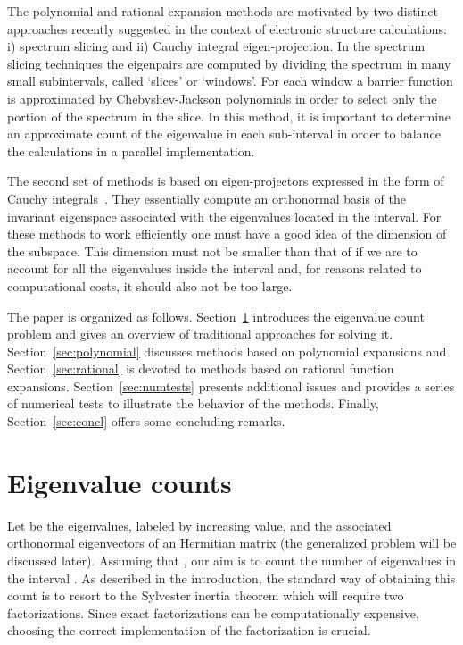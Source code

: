 \documentclass[12pt]{article}		\usepackage{tabls,multirow}
\begin{document}
The polynomial and rational expansion methods are motivated by 
two distinct approaches recently suggested in the context of
electronic structure calculations: i) spectrum slicing and ii) Cauchy
integral eigen-projection. In the spectrum slicing techniques
\cite{Schofield-al-2011} the eigenpairs are computed by dividing the
spectrum in many small subintervals, called `slices' or `windows'.
For each window a barrier function is approximated by
Chebyshev-Jackson polynomials in order to select only the portion of
the spectrum in the slice. In this method, it is important to
determine an approximate count of the eigenvalue in each sub-interval
in order to balance the calculations in a parallel
implementation. 

The second set of methods is based on eigen-projectors
expressed in the form of Cauchy integrals~\cite{FEAST,SakSig03}.
They essentially compute an orthonormal basis of the invariant
eigenspace  associated with the eigenvalues located in the
interval. For these methods to work efficiently one must have a good
idea of the dimension of the subspace. This dimension must not be
smaller than that of  if we are to account for all the
eigenvalues inside the interval  and, for reasons related to
computational costs, it should also not be too large.  


The paper is organized as follows.
Section~\ref{sec:eigcount} introduces the eigenvalue count problem
and gives an overview of traditional approaches for solving it.
Section~\ref{sec:polynomial} discusses methods based on
polynomial expansions and 
Section~\ref{sec:rational} is devoted to methods based on
rational function expansions. Section~\ref{sec:numtests} 
presents additional issues and provides a series of numerical
tests to illustrate the behavior of  the methods.
Finally, Section~\ref{sec:concl} offers some concluding remarks. 


\section{Eigenvalue counts}
\label{sec:eigcount}
Let  be the eigenvalues, labeled by
increasing value, and  the associated
orthonormal eigenvectors of an Hermitian matrix  (the generalized
problem will be discussed later). Assuming that , our aim is to count the number of eigenvalues
 in the interval . As described in the introduction,
the standard way of obtaining this count is to resort to the Sylvester
inertia theorem which will require two  factorizations. Since
exact factorizations can be computationally expensive, choosing the
correct implementation of the  factorization is crucial.
\end{document}
